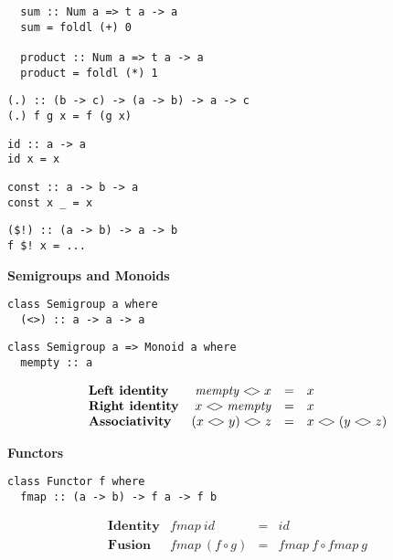 \begin{multicols}{2}
\begin{verbatim}
  sum :: Num a => t a -> a 
  sum = foldl (+) 0

  product :: Num a => t a -> a
  product = foldl (*) 1
\end{verbatim}
	
\begin{verbatim}
(.) :: (b -> c) -> (a -> b) -> a -> c
(.) f g x = f (g x)
\end{verbatim}
	
\begin{verbatim}
id :: a -> a
id x = x
\end{verbatim}
	
\begin{verbatim}
const :: a -> b -> a
const x _ = x
\end{verbatim}
	
\begin{verbatim}
($!) :: (a -> b) -> a -> b
f $! x = ...
\end{verbatim}

\vspace{2cm}
\textbf{\large Semigroups and Monoids}\\
\begin{verbatim}
class Semigroup a where 
  (<>) :: a -> a -> a
\end{verbatim}

\begin{verbatim}
class Semigroup a => Monoid a where 
  mempty :: a
\end{verbatim}
\begin{displaymath}
\begin{array}{lrcl}
\textbf{Left identity} & \mathit{mempty} <\!> x & = & x \\
\textbf{Right identity} & x <\!> \mathit{mempty} & = & x \\
\textbf{Associativity} & (x <\!> y) <\!> z & = & x <\!> (y <\!> z)
\end{array}
\end{displaymath}
	
\textbf{\large Functors}\\
	
\begin{verbatim}
class Functor f where 
  fmap :: (a -> b) -> f a -> f b
\end{verbatim}
\begin{displaymath}
\begin{array}{lrcl}
\textbf{Identity} & \mathit{fmap}~\mathit{id} & = &  \mathit{id} \\
\textbf{Fusion} & \mathit{fmap}~(f \circ g) & = & \mathit{fmap}~f \circ \mathit{fmap}~g
\end{array}
\end{displaymath}
	

\end{multicols}
